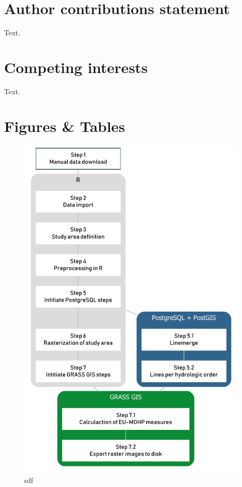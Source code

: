 \documentclass[fleqn,10pt]{wlscirep}
\begin{document}
\hypertarget{author-contributions-statement}{%
\section*{Author contributions statement}\label{author-contributions-statement}}

Text.

\hypertarget{competing-interests}{%
\section*{Competing interests}\label{competing-interests}}

Text.

\hypertarget{figures-tables}{%
\section*{Figures \& Tables}\label{figures-tables}}

\begin{figure}[H]

{\centering \includegraphics[width=0.7\linewidth]{diagramms/flowchart} 

}

\caption{sdf}\label{fig:flowchart}
\end{figure}

\nocite{*}

\end{document}

